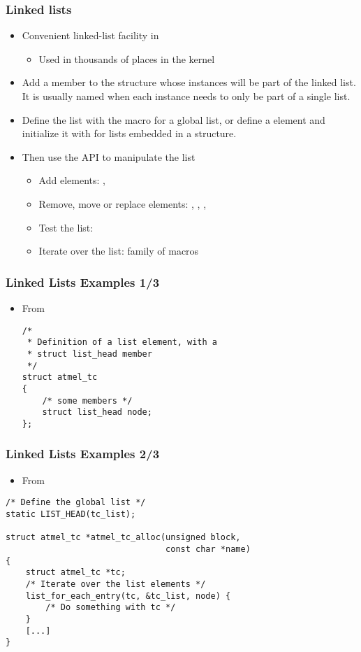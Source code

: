 \begin{frame}
  \frametitle{Linked lists}
  \begin{itemize}
  \item Convenient linked-list facility in 
    \begin{itemize}
    \item Used in thousands of places in the kernel
    \end{itemize}
  \item Add a  member to the structure whose
    instances will be part of the linked list. It is usually named
     when each instance needs to only be part of a single
    list.
  \item Define the list with the  macro for a global
    list, or define a  element and initialize
    it with  for lists embedded in a structure.
  \item Then use the  API to manipulate the list
    \begin{itemize}
    \item Add elements: , 
    \item Remove, move or replace elements: ,
      , ,
    \item Test the list: 
    \item Iterate over the list:  family of macros
    \end{itemize}
  \end{itemize}
\end{frame}

\begin{frame}[fragile]
  \frametitle{Linked Lists Examples 1/3}
  \begin{itemize}
  \item From 
\begin{verbatim}
/*
 * Definition of a list element, with a
 * struct list_head member
 */
struct atmel_tc
{
    /* some members */
    struct list_head node;
};
\end{verbatim}
\end{itemize}
\end{frame}

\begin{frame}[fragile]
  \frametitle{Linked Lists Examples 2/3}
  \begin{itemize}
  \item From 
  \end{itemize}
\begin{verbatim}
/* Define the global list */
static LIST_HEAD(tc_list);

struct atmel_tc *atmel_tc_alloc(unsigned block,
                                const char *name)
{
    struct atmel_tc *tc;
    /* Iterate over the list elements */
    list_for_each_entry(tc, &tc_list, node) {
        /* Do something with tc */
    }
    [...]
}
\end{verbatim}
\end{frame}

